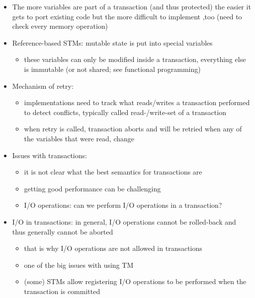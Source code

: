 \documentclass[a4paper]{article}
\begin{document}
\begin{itemize}
\begin{itemize}
\begin{enumerate}
\begin{itemize}
\end{itemize}
\end{enumerate}
\end{itemize}
\item The more variables are part of a transaction (and thus protected) the easier it gets to port existing code but the more difficult to implement ,too (need to check every memory operation)
\item Reference-based STMs: mutable state is put into special variables
\begin{itemize}
\item  these variables can only be modified inside a transaction, everything else is immutable (or not shared; see functional programming)
\end{itemize}
\item Mechanism of retry: 
\begin{itemize}
\item implementations need to track what reads/writes a transaction performed to detect conflicts, typically called read-/write-set of a transaction
\item when retry is called, transaction aborts and will be retried when any of the variables that were read, change
\end{itemize}
\item Issues with transactions:
\begin{itemize}
\item it is not clear what the best semantics for transactions are
\item getting good performance can be challenging
\item I/O operations: can we perform I/O operations in a transaction?
\end{itemize}
\item I/O  in transactions: in general, I/O operations cannot be rolled-back and thus generally cannot be aborted
\begin{itemize}
\item that is why I/O operations are not allowed in transactions
\item one of the big issues with using TM
\item (some) STMs allow registering I/O operations to be performed when the transaction is committed
\end{itemize}
\end{itemize}
\end{document}
